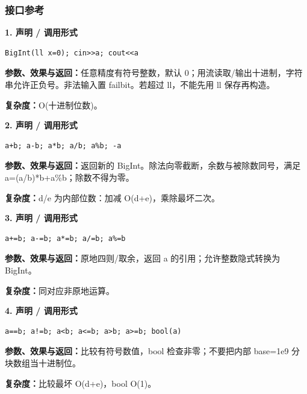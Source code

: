 \documentclass[UTF8,a4paper,10pt]{ctexart}
\begin{document}
\subsubsection*{接口参考}
\noindent\begin{minipage}{\textwidth}
\textbf{1. 声明 / 调用形式}
\begin{lstlisting}
BigInt(ll x=0); cin>>a; cout<<a
\end{lstlisting}
\textbf{参数、效果与返回：}任意精度有符号整数，默认 0；用流读取/输出十进制，字符串允许正负号。非法输入置 failbit。若超过 ll，不能先用 ll 保存再构造。

\textbf{复杂度：}O(十进制位数)。

\end{minipage}\par\vspace{0.4em}
\noindent\begin{minipage}{\textwidth}
\textbf{2. 声明 / 调用形式}
\begin{lstlisting}
a+b; a-b; a*b; a/b; a%b; -a
\end{lstlisting}
\textbf{参数、效果与返回：}返回新的 BigInt。除法向零截断，余数与被除数同号，满足 a=(a/b)*b+a\%b；除数不得为零。

\textbf{复杂度：}d/e 为内部位数：加减 O(d+e)，乘除最坏二次。

\end{minipage}\par\vspace{0.4em}
\noindent\begin{minipage}{\textwidth}
\textbf{3. 声明 / 调用形式}
\begin{lstlisting}
a+=b; a-=b; a*=b; a/=b; a%=b
\end{lstlisting}
\textbf{参数、效果与返回：}原地四则/取余，返回 a 的引用；允许整数隐式转换为 BigInt。

\textbf{复杂度：}同对应非原地运算。

\end{minipage}\par\vspace{0.4em}
\noindent\begin{minipage}{\textwidth}
\textbf{4. 声明 / 调用形式}
\begin{lstlisting}
a==b; a!=b; a<b; a<=b; a>b; a>=b; bool(a)
\end{lstlisting}
\textbf{参数、效果与返回：}比较有符号数值，bool 检查非零；不要把内部 base=1e9 分块数组当十进制位。

\textbf{复杂度：}比较最坏 O(d+e)，bool O(1)。

\end{minipage}\par\vspace{0.4em}
\end{document}
